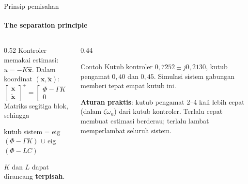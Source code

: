 \documentclass[aspectratio=169,10pt]{beamer}
\begin{document}
\begin{frame}{Prinsip pemisahan}
	\framesubtitle{The separation principle}
	\begin{columns}[T]
		\begin{column}{0.52\textwidth}
			\small
			Kontroler memakai estimasi: $u = -K\hat{\mathbf{x}}$. Dalam koordinat $(\mathbf{x}, \tilde{\mathbf{x}})$:
			\[
				\begin{bmatrix}\mathbf{x}\\ \tilde{\mathbf{x}}\end{bmatrix}^{\!+} = \begin{bmatrix}\Phi - \Gamma K & \Gamma K\\ 0 & \Phi - LC\end{bmatrix}\begin{bmatrix}\mathbf{x}\\ \tilde{\mathbf{x}}\end{bmatrix}
			\]
			Matriks segitiga blok, sehingga
			\begin{block}{}
				\small
				kutub sistem = eig$(\Phi - \Gamma K)$ $\cup$ eig$(\Phi - LC)$
			\end{block}
			$K$ dan $L$ dapat dirancang \textbf{terpisah}.
		\end{column}
		\begin{column}{0.44\textwidth}
			\begin{exampleblock}{Contoh}
				\small
				Kutub kontroler $0{,}7252 \pm j0{,}2130$, kutub pengamat $0{,}40$ dan $0{,}45$. Simulasi sistem gabungan memberi tepat empat kutub ini.
			\end{exampleblock}
			\small
			\textbf{Aturan praktis}: kutub pengamat 2--4 kali lebih cepat (dalam $\zeta\omega_n$) dari kutub kontroler. Terlalu cepat membuat estimasi berderau; terlalu lambat memperlambat seluruh sistem.
		\end{column}
	\end{columns}
\end{frame}
\end{document}
